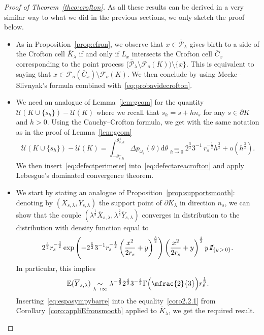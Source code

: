 \documentclass[10pt]{amsart}
\theoremstyle{definition}\newtheorem{defi}[theo]{Definition}\newtheorem{rema}[theo]{Remark}\newtheorem{exam}[theo]{Example}\newtheorem{exem}[theo]{Example}\newtheorem{nota}[theo]{Notation}
\newcommand{\indicat}{{\text{1}}\negthickspace\text{I}}
\newcommand{\cF}{\mathcal{F}}
\newcommand{\cP}{\mathcal{P}}
\newcommand{\cU}{\mathcal{U}}
\newcommand{\dd}{\mathrm{d}}
\newcommand{\od}{\mathrm{o}}
\newcommand{\E}{\mathbb{E}}
\newcommand*{\MK}{\mkern 2mu}
\begin{document}
\begin{proof}[{Proof of Theorem~\ref{theo:crofton}}]
As all these results can be derived in a very similar way to what we did in the previous sections, we only sketch the proof below.
\begin{itemize}
\item[\eqref{theo7.1.a}] As in Proposition~\ref{prop:efron}, we observe that $x\in \overline{\cP}_\lambda$ gives birth to a side of the Crofton cell $\overline{K}_{\lambda}$ if and only if $L_x$ intersects the Crofton cell $\overline{C}_x$ corresponding to the point process ($\overline{\cP}_\lambda\setminus \cF_o(K))\setminus\{x\}$. This is equivalent to saying that $x\in {\cF}_o(\overline{C}_x)\setminus\cF_o(K)$. We then conclude by using Mecke--Slivnyak's formula combined with~\eqref{eq:probavidecrofton}.\\

\item[\eqref{theo7.1.b}$\MK$\eqref{theo7.1.b.1}] We need an analogue of Lemma~\ref{lem:geom} for the quantity $\cU(K\cup\{s_h\})-\cU(K)$ where we recall that $s_h=s+hn_s$ for any $s\in \partial K$ and $h>0$. Using the Cauchy--Crofton formula, we get with the same notation as in the proof of Lemma~\ref{lem:geom}
\begin{equation}\label{eq:defectperimeter}
\cU(K\cup\{s_h\})-\cU(K) =\int_{-\theta_{s,h}^-}^{\theta_{s,h}^+}\Delta p_{\omega_s}(\theta)\dd\theta
\underset{h\to 0}{=}2^{\frac{5}{2}}3^{-1}\, r_s^{-\frac1{2}} h^{\frac{3}{2}}+ \od\left(h^{\frac32}\right).
\end{equation}
We then insert~\eqref{eq:defectperimeter} into~\eqref{eq:defectareacrofton} and apply Lebesgue's dominated convergence theorem.
\pagebreak

\item[\eqref{theo7.1.b}$\MK$\eqref{theo7.1.b.2}] We start by stating an analogue of Proposition~\ref{prop:supportsmooth}: denoting by $(\overline{X}_{s,\lambda},\overline{Y}_{s,\lambda})$ the support point of $\partial \overline{K}_{\lambda}$ in direction $n_s$, we can show that the couple $(\lambda^{\frac1{3}}\overline{X}_{s,\lambda}, \lambda^{\frac{2}{3}}\overline{Y}_{s,\lambda})$ converges in distribution to the distribution with density function equal to
\[
2^{\frac{3}{2}} r_s^{-\frac{3}{2}}\exp\left(-2^{\frac{5}{2}} 3^{-1}r_s^{-\frac1{2}}
\left(\frac{x^2}{2r_s}+y\right)^{\frac{3}{2}}\right)\left(\frac{x^2}{2r_s}+y\right)^{\frac1{2}}y{\emph{\indicat}}_{\{y\,>\,0\}}.
\]
In particular, this implies
\begin{equation}\label{eq:espasympybarre}
\E(\overline{Y}_{s,\lambda})\underset{\lambda\to\infty}{\sim}\lambda^{-\frac{2}{3}}2^{\frac43}3^{-\frac{4}{3}}\Gamma\Big(\mfrac{2}{3}\Big) r_s^{\frac1{3}}.
\end{equation}
Inserting~\eqref{eq:espasympybarre} into the equality~\eqref{coro2.2.1} from Corollary~\ref{coro:appliEfronsmooth} applied to $\overline{K}_{\lambda}$, we get the required result.\\


\end{itemize}
\end{proof}
\end{document}
